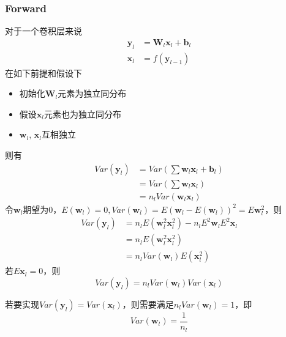 \subsubsection{Forward}
对于一个卷积层来说
\begin{equation}
    \begin{split}
        \mathbf{y}_l &= \mathbf{W}_l \mathbf{x}_l + \mathbf{b}_l\\
        \mathbf{x}_l &= f(\mathbf{y}_{l-1})
    \end{split}
\end{equation}
在如下前提和假设下
\begin{itemize}
    \item 初始化$\mathbf{W}_l$元素为独立同分布
    \item 假设$\mathbf{x}_l$元素也为独立同分布
    \item $\mathbf{w}_l$, $\mathbf{x}_l$互相独立
\end{itemize}
则有
\begin{equation}
    \begin{split}
        Var(\mathbf{y}_l) &= Var(\sum \mathbf{w}_l \mathbf{x}_l + \mathbf{b}_l)\\
        &= Var(\sum \mathbf{w}_l \mathbf{x}_l) \\
        &= n_l Var(\mathbf{w}_l \mathbf{x}_l)
    \end{split}
\end{equation}
令$\mathbf{w}_l$期望为0，$E(\mathbf{w}_l) = 0, Var(\mathbf{w}_l) = E(\mathbf{w}_l - E(\mathbf{w}_l))^2 = E\mathbf{w}_l^2$，则
\begin{equation}
    \begin{split}
        Var(\mathbf{y}_l) &= n_l E(\mathbf{w}_l^2\mathbf{x}_l^2) - n_l E^2\mathbf{w}_l E^2 \mathbf{x}_l \\
        &= n_l E(\mathbf{w}_l^2\mathbf{x}_l^2) \\
        &= n_l Var(\mathbf{w}_l)E(\mathbf{x}_l^2)
    \end{split}
\end{equation}
若$E\mathbf{x}_l = 0$，则
\begin{equation}
    Var(\mathbf{y}_l) = n_l Var(\mathbf{w}_l)Var(\mathbf{x}_l)
\end{equation}

若要实现$Var(\mathbf{y}_l) = Var(\mathbf{x}_l)$，则需要满足$n_l Var(\mathbf{w}_l) = 1$，即
\begin{equation}
    Var(\mathbf{w}_l) = \frac{1}{n_l}
\end{equation}

